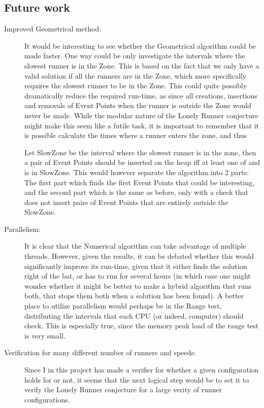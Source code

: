 \subsection{Future work}
\begin{description}
\item[Improved Geometrical method:] It would be interesting to see whether the Geometrical algorithm could be made faster. One way could be only investigate the intervals where the slowest runner is in the Zone. This is based on the fact that we only have a valid solution if all the runners are in the Zone, which more specifically requires the slowest runner to be in the Zone. This could quite possibly dramatically reduce the required run-time, as since all creations, insertions and removals of Event Points when the runner is outside the Zone would never be made. While the modular nature of the Lonely Runner conjecture might make this seem like a futile task, it is important to remember that it is possible calculate the times where a runner enters the zone, and thus 

Let SlowZone be the interval where the slowest runner is in the zone, then a pair of Event Points should be inserted on the heap iff at least one of \comStart and \comFin is in SlowZone. This would however separate the algorithm into 2 parts: The first part which finds the first Event Points that could be interesting, and the second part which is the same as before, only with a check that does not insert pairs of Event Points that are entirely outside the SlowZone.

\item[Parallelism:] It is clear that the Numerical algorithm can take advantage of multiple threads. However, given the results, it can be debated whether this would significantly improve its run-time, given that it either finds the solution right of the bat, or has to run for several hours (in which case one might wonder whether it might be better to make a hybrid algorithm that runs both, that stops them both when a solution has been found). A better place to utilize parallelism would perhaps be in the Range test, distributing the intervals that each CPU (or indeed, computer) should check. This is especially true, since the memory peak load of the range test is very small.

\item[Verification for many different number of runners and speeds:] Since I in this project has made a verifier for whether a given configuration holds for  or not, it seems that the next logical step would be to set it to verify the Lonely Runner conjecture for a large verity of runner configurations. 
\end{description}
